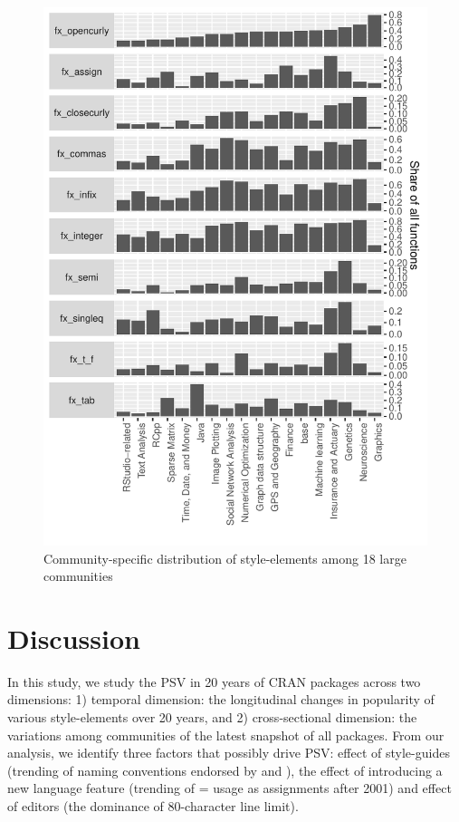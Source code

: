 \begin{figure}[htbp]
  \centering
  \includegraphics{fig5}
  \caption{Community-specific distribution of style-elements among 18 large communities}
  \label{figure:fig5}
\end{figure}

\section{Discussion}

In this study, we study the PSV in 20 years of CRAN packages across two dimensions: 1) temporal dimension: the longitudinal changes in popularity of various style-elements over 20 years, and 2) cross-sectional dimension: the variations among communities of the latest snapshot of all packages. From our analysis, we identify three factors that possibly drive PSV: effect of style-guides (trending of naming conventions endorsed by \citet{tidyverse} and \citet{google}), the effect of introducing a new language feature (trending of = usage as assignments after 2001) and effect of editors (the dominance of 80-character line limit).

